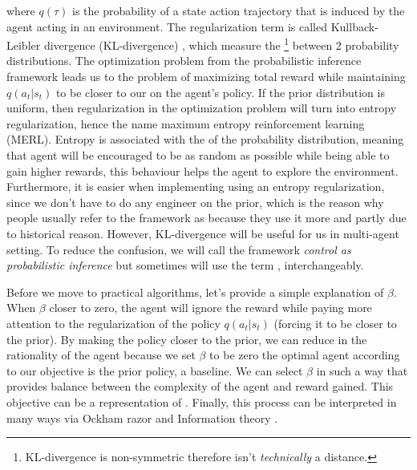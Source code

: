 where $q(\tau)$ is the probability of a state action trajectory that is induced by the agent acting in an environment. The regularization term is called Kullback-Leibler divergence (KL-divergence) \cite{kullback1951information, sherman1960solomon}, which measure the \footnote{KL-divergence is non-symmetric therefore isn't \textit{technically} a distance.} between 2 probability distributions. The optimization problem from the probabilistic inference framework leads us to the problem of maximizing total reward while maintaining $q(a_t | s_t)$ to be closer to our  on the agent's policy. If the prior distribution is uniform, then regularization in the optimization problem will turn into entropy regularization, hence the name maximum entropy reinforcement learning (MERL). Entropy is associated with the  of the probability distribution, meaning that agent will be encouraged to be as random as possible while being able to gain higher rewards, this behaviour helps the agent to explore the environment. Furthermore, it is easier when implementing using an entropy regularization, since we don't have to do any engineer on the prior, which is the reason why people usually refer to the framework as  because they use it more and partly due to historical reason. However, KL-divergence will be useful for us in multi-agent setting. To reduce the confusion, we will call the framework \textit{control as probabilistic inference} but sometimes will use the term , interchangeably. 

Before we move to practical algorithms, let's provide a simple explanation of $\beta$. When $\beta$ closer to zero, the agent will ignore the reward while paying more attention to the regularization of the policy $q(a_t | s_t)$ (forcing it to be closer to the prior). By making the policy closer to the prior, we can reduce in the rationality of the agent because we set $\beta$ to be zero the optimal agent according to our objective is the prior policy, a baseline. We can select $\beta$ in such a way that provides balance between the complexity of the agent and reward gained. This objective can be a representation of . Finally, this process can be interpreted in many ways via Ockham razor and Information theory \cite{ortega2013thermodynamics, tim2015bounded}.


